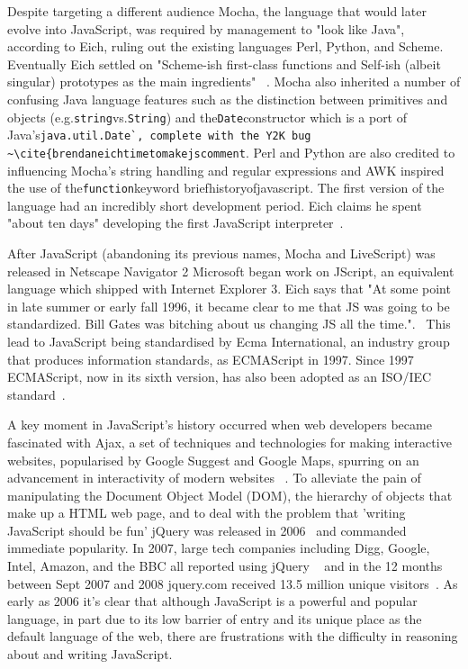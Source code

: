 \documentclass[]{final_report}
\begin{document}
Despite targeting a different audience Mocha, the language that would later evolve into JavaScript, was required by management to "look like Java", according to Eich, ruling out the existing languages Perl, Python, and Scheme. Eventually Eich settled on "Scheme-ish first-class functions and Self-ish (albeit singular) prototypes as the main ingredients" ~\cite{popularityofjavascript}. Mocha also inherited a number of confusing Java language features such as the distinction between primitives and objects (e.g.\lstinline{string}vs.\lstinline{String}) and the\lstinline{Date}constructor which is a port of Java's\lstinline{java.util.Date`, complete with the Y2K bug ~\cite{brendaneichtimetomakejscomment}. Perl and Python are also credited to influencing Mocha's string handling and regular expressions and AWK inspired the use of the\lstinline{function}keyword briefhistoryofjavascript. The first version of the language had an incredibly short development period. Eich claims he spent "about ten days" developing the first JavaScript interpreter~\cite{AZProgrammingLanguages}.

After JavaScript (abandoning its previous names, Mocha and LiveScript) was released in Netscape Navigator 2 Microsoft began work on JScript, an equivalent language which shipped with Internet Explorer 3. Eich says that "At some point in late summer or early fall 1996, it became clear to me that JS was going to be standardized. Bill Gates was bitching about us changing JS all the time.".~\cite{newjavascriptmoduleowner} This lead to JavaScript being standardised by Ecma International, an industry group that produces information standards, as ECMAScript in 1997. Since 1997 ECMAScript, now in its sixth version, has also been adopted as an ISO/IEC standard~\cite{ISO/IEC16262:2011}.

A key moment in JavaScript's history occurred when web developers became fascinated with Ajax, a set of techniques and technologies for making interactive websites, popularised by Google Suggest and Google Maps, spurring on an advancement in interactivity of modern websites ~\cite{ajax}. To alleviate the pain of manipulating the Document Object Model (DOM), the hierarchy of objects that make up a HTML web page, and to deal with the problem that  'writing JavaScript should be fun' jQuery was released in 2006~\cite{historyofjquery} and commanded immediate popularity. In 2007, large tech companies including Digg, Google, Intel, Amazon, and the BBC all reported using jQuery ~\cite{historyofjquery} and in the 12 months between Sept 2007 and 2008 jquery.com received 13.5 million unique visitors~\cite{stateofjquery}. As early as 2006 it's clear that although JavaScript is a powerful and popular language, in part due to its low barrier of entry and its unique place as the default language of the web, there are frustrations with the difficulty in reasoning about and writing JavaScript.
\end{document}

